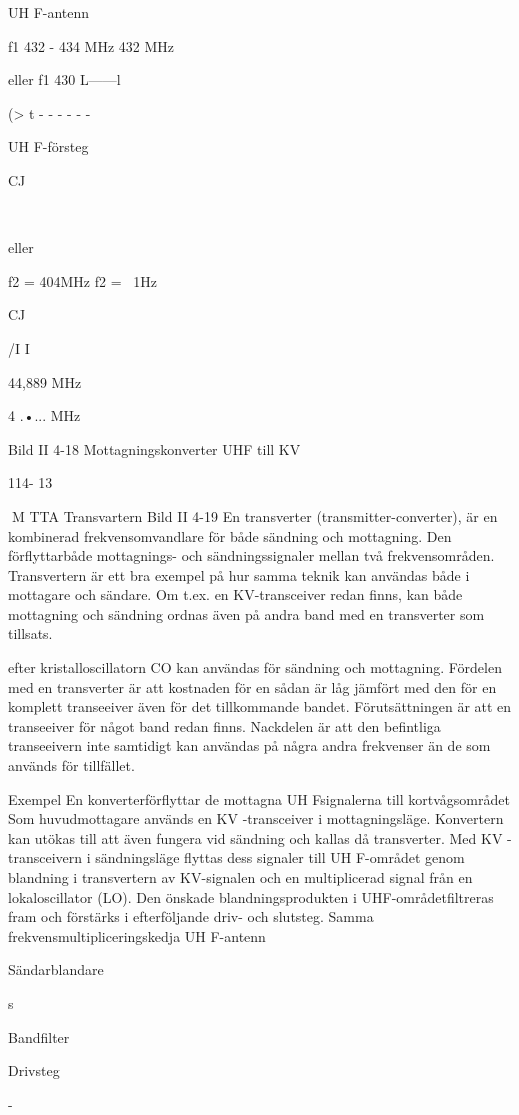 UH F-antenn

f1 432 - 434 MHz
432 MHz

eller f1 430 L------l

(> t - - - - - -

UH F-försteg

CJ

~

eller

f2 = 404MHz
f2 =
~1Hz

CJ

/I I~

44,889 MHz

4 .•... MHz

Bild II 4-18 Mottagningskonverter UHF till KV

114- 13

M TTA
Transvartern
Bild II 4-19
En transverter (transmitter-converter), är
en kombinerad frekvensomvandlare för både
sändning och mottagning. Den förflyttarbåde
mottagnings- och sändningssignaler mellan två frekvensområden.
Transvertern är ett bra exempel på hur
samma teknik kan användas både i mottagare och sändare. Om t.ex. en KV-transceiver redan finns, kan både mottagning
och sändning ordnas även på andra band
med en transverter som tillsats.

efter kristalloscillatorn CO kan användas för
sändning och mottagning.
Fördelen med en transverter är att kostnaden för en sådan är låg jämfört med den
för en komplett transeeiver även för det
tillkommande bandet. Förutsättningen är att
en transeeiver för något band redan finns.
Nackdelen är att den befintliga transeeivern inte samtidigt kan användas på några
andra frekvenser än de som används för
tillfället.

Exempel
En konverterförflyttar de mottagna UH Fsignalerna till kortvågsområdet Som huvudmottagare används en KV -transceiver i
mottagningsläge. Konvertern kan utökas till
att även fungera vid sändning och kallas då
transverter. Med KV -transceivern i sändningsläge flyttas dess signaler till UH F-området genom blandning i transvertern av
KV-signalen och en multiplicerad signal från
en lokaloscillator (LO). Den önskade blandningsprodukten i UHF-områdetfiltreras fram
och förstärks i efterföljande driv- och slutsteg. Samma frekvensmultipliceringskedja
UH F-antenn

Sändarblandare

s

Bandfilter

Drivsteg

-

